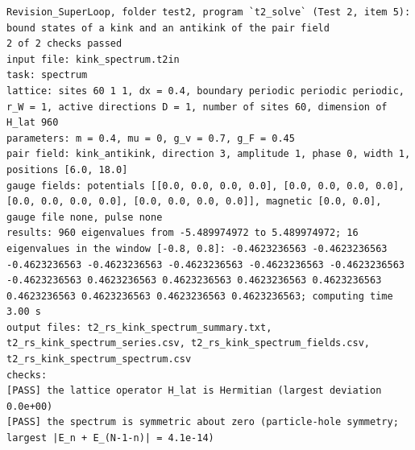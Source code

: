 \documentclass[
  10pt,
]{article}
\begin{document}
\begin{verbatim}
Revision_SuperLoop, folder test2, program `t2_solve` (Test 2, item 5): bound states of a kink and an antikink of the pair field
2 of 2 checks passed
input file: kink_spectrum.t2in
task: spectrum
lattice: sites 60 1 1, dx = 0.4, boundary periodic periodic periodic, r_W = 1, active directions D = 1, number of sites 60, dimension of H_lat 960
parameters: m = 0.4, mu = 0, g_v = 0.7, g_F = 0.45
pair field: kink_antikink, direction 3, amplitude 1, phase 0, width 1, positions [6.0, 18.0]
gauge fields: potentials [[0.0, 0.0, 0.0, 0.0], [0.0, 0.0, 0.0, 0.0], [0.0, 0.0, 0.0, 0.0], [0.0, 0.0, 0.0, 0.0]], magnetic [0.0, 0.0], gauge file none, pulse none
results: 960 eigenvalues from -5.489974972 to 5.489974972; 16 eigenvalues in the window [-0.8, 0.8]: -0.4623236563 -0.4623236563 -0.4623236563 -0.4623236563 -0.4623236563 -0.4623236563 -0.4623236563 -0.4623236563 0.4623236563 0.4623236563 0.4623236563 0.4623236563 0.4623236563 0.4623236563 0.4623236563 0.4623236563; computing time 3.00 s
output files: t2_rs_kink_spectrum_summary.txt, t2_rs_kink_spectrum_series.csv, t2_rs_kink_spectrum_fields.csv, t2_rs_kink_spectrum_spectrum.csv
checks:
[PASS] the lattice operator H_lat is Hermitian (largest deviation 0.0e+00)
[PASS] the spectrum is symmetric about zero (particle-hole symmetry; largest |E_n + E_(N-1-n)| = 4.1e-14)
\end{verbatim}
\end{document}
